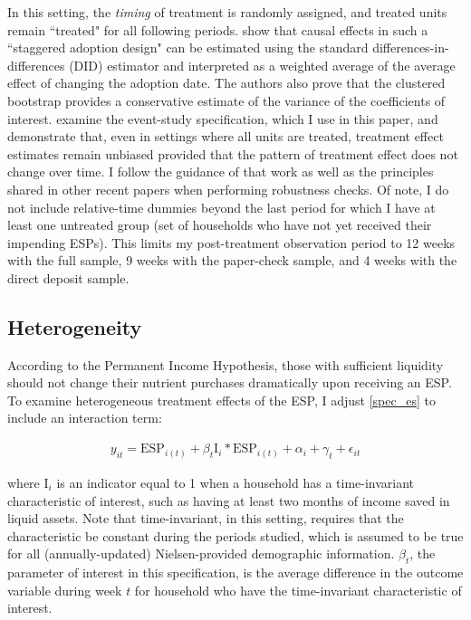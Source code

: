 \documentclass[12pt]{article}
\begin{document}
In this setting, the \textit{timing} of treatment is randomly assigned, and treated units remain ``treated" for all following periods.
\textcite{athey2021design} show that causal effects in such a ``staggered adoption design" can be estimated using the standard differences-in-differences (DID) estimator and interpreted as a weighted average of the average effect of changing the adoption date.
The authors also prove that the clustered bootstrap provides a conservative estimate of the variance of the coefficients of interest.
\textcite{sun2020estimating} examine the event-study specification, which I use in this paper, and demonstrate that, even in settings where all units are treated, treatment effect estimates remain unbiased provided that the pattern of treatment effect does not change over time.
I follow the guidance of that work as well as the principles shared in other recent papers \parencite{goodman2018difference, callaway2020difference, de2020two} when performing robustness checks.
Of note, I do not include relative-time dummies beyond the last period for which I have at least one untreated group (set of households who have not yet received their impending ESPs).
This limits my post-treatment observation period to 12 weeks with the full sample, 9 weeks with the paper-check sample, and 4 weeks with the direct deposit sample.

\subsection{Heterogeneity}

According to the Permanent Income Hypothesis, those with sufficient liquidity should not change their nutrient purchases dramatically upon receiving an ESP.
To examine heterogeneous treatment effects of the ESP, I adjust \ref{spec_es} to include an interaction term:

\begin{align}
	y_{it} = \text{ESP}_{i(t)} + \beta_t \text{I}_{i} * \text{ESP}_{i(t)} + \alpha_i + \gamma_t + \epsilon_{it} \label{spec_het}
\end{align}

where $\text{I}_{i}$ is an indicator equal to 1 when a household has a time-invariant characteristic of interest, such as having at least two months of income saved in liquid assets.
Note that time-invariant, in this setting, requires that the characteristic be constant during the periods studied, which is assumed to be true for all (annually-updated) Nielsen-provided demographic information.
$\beta_t$, the parameter of interest in this specification, is the average difference in the outcome variable during week $t$ for household who have the time-invariant characteristic of interest.
\end{document}

